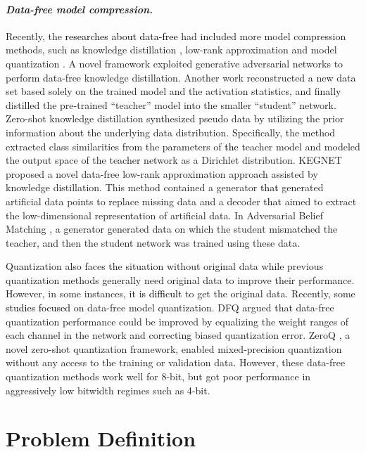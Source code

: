 \documentclass[runningheads]{llncs}
\def\new{\textcolor{black}}
\begin{document}
\paragraph{\emph{\textbf{Data-free model compression.}}}
Recently, the \new{researches about data-free} had included more model compression methods, such as knowledge distillation \cite{nayak2019zero,chen2019data}, low-rank approximation \cite{yoo2019knowledge} and model quantization \cite{zhao2019improving}.
A novel framework \cite{chen2019data} exploited generative adversarial networks to perform data-free knowledge distillation. Another work \cite{lopes2017data}  reconstructed a new data set based solely on the trained model and the activation statistics, and finally distilled the pre-trained ``teacher'' model into the smaller ``student'' network. 
Zero-shot knowledge distillation \cite{nayak2019zero} synthesized pseudo data by utilizing the prior information about the underlying data distribution. Specifically, the method extracted class similarities from the parameters of \new{the} teacher model and modeled the output space of the teacher network as a Dirichlet distribution. KEGNET \cite{yoo2019knowledge} proposed a novel data-free low-rank approximation approach assisted by knowledge distillation. This method contained a generator \new{that} generated artificial data points to replace missing data and a decoder \new{that} aimed to extract the low-dimensional representation of artificial data. In Adversarial Belief Matching \cite{micaelli2019zero-shot}, a generator generated data on which the student mismatched the teacher, and then the student network was trained using these data.

Quantization also faces the situation without original data while
previous quantization methods generally need original data to improve their performance. However, in some instances, it \new{is difficult} to get the original data. Recently, some \new{studies focused} on data-free model quantization.
DFQ \cite{nagel2019data} argued that data-free quantization performance could be improved by equalizing the weight ranges of each channel in the network and correcting biased quantization error.
ZeroQ \cite{Cai_2020_CVPR}, a novel zero-shot quantization framework, enabled mixed-precision quantization without any access to the training or validation data. 
However, these data-free quantization methods work well for 8-bit, but got poor performance in aggressively low bitwidth regimes such as 4-bit.


\section{Problem Definition}
\label{problem_definition}
\end{document}
